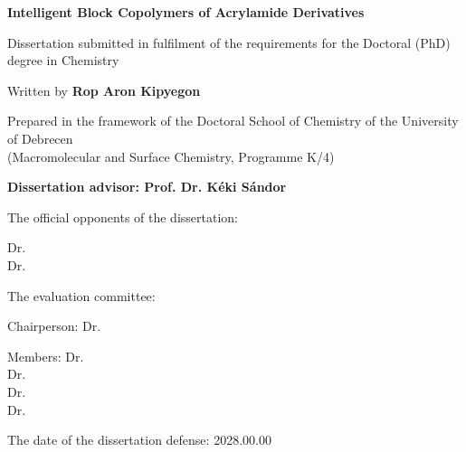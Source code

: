 \begin{Opponents}

\begin{center}
	\Large
	\Large {\textbf{Intelligent Block Copolymers of Acrylamide Derivatives}}
	
	\vspace{0.5cm}
	
	Dissertation submitted in fulfilment of the requirements for the Doctoral (PhD) degree in Chemistry

	\vspace{0.5cm}
	
	Written by \textbf{Rop Aron Kipyegon}
	
	\vspace{0.5cm}
	
	Prepared in the framework of the Doctoral School of Chemistry of the University of Debrecen \\
	(Macromolecular and Surface Chemistry, Programme K/4)
	
	\vspace{0.5cm}
	
	\textbf{Dissertation advisor: Prof. Dr. Kéki Sándor}
	
	\vspace{0.5cm}
	
	The official opponents of the dissertation:
	
	\vspace{0.5cm}
	
	Dr.\dotfill \dotfill \\
	\vspace{0.5cm}
	Dr.\dotfill \dotfill
	
	\vspace{0.4cm}
	
	The evaluation committee:
	
	\vspace{0.5cm}
	
	Chairperson: Dr.\dotfill \dotfill
	
	\vspace{0.4cm}
	
	Members: Dr.\dotfill \dotfill \\
	\vspace{0.4cm}
	Dr.\dotfill \dotfill \\
	\vspace{0.4cm}
	Dr.\dotfill \dotfill \\
	\vspace{0.4cm}
	Dr.\dotfill \dotfill
	
	\vspace{0.5cm}
	The date of the dissertation defense: 2028.00.00 
\end{center}
\end{Opponents}
	




